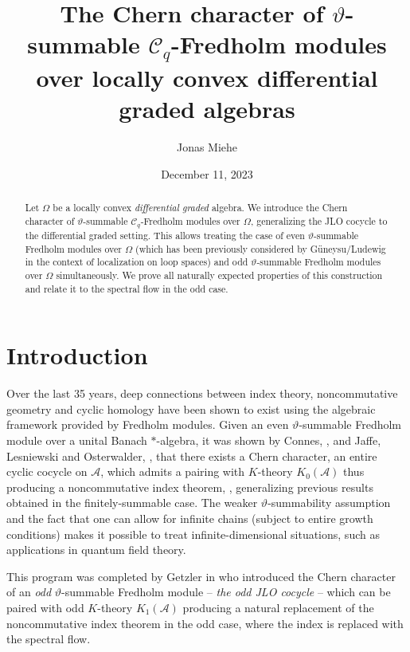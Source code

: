 \documentclass[a4paper, english, 12pt, bibliography=totocnumbered,
index=totoc]{scrartcl}
\title{The Chern character of \texorpdfstring{$\vartheta$}{ϑ}-summable
\texorpdfstring{$\mathcal{C}_q$}{C(q)}-Fredholm modules over locally convex
differential graded algebras}
\author{Jonas Miehe}
\date{December 11, 2023}
\begin{document}
\maketitle

\begin{abstract}
	Let $\Omega$ be a locally convex \emph{differential graded} algebra.
	We introduce the Chern character of $\vartheta$-summable
	$\mathcal{C}_q$-Fredholm modules over $\Omega$,
	generalizing the JLO cocycle to the differential graded setting.
	This allows treating the case of even $\vartheta$-summable Fredholm modules
	over $\Omega$
	(which has been previously considered by Güneysu/Ludewig in the context of
	localization on loop spaces) and odd
	$\vartheta$-summable Fredholm modules over $\Omega$
	simultaneously.
	We prove all naturally expected properties of this construction and
	relate it to the spectral flow in the odd case.
\end{abstract}

\section{Introduction}
Over the last 35 years, deep connections between index theory, noncommutative
geometry and cyclic homology have been shown to exist using the
algebraic framework provided by Fredholm modules.
Given an even $\vartheta$-summable Fredholm module over a unital Banach
$*$-algebra, it was shown by Connes, \cite{ConnesCyclicCohomology}, and
Jaffe, Lesniewski and Osterwalder, \cite{JLO}, that there exists a Chern
character, an entire cyclic
cocycle on $\mathcal{A}$, which admits a pairing with $K$-theory
$K_0(\mathcal{A})$ thus producing a noncommutative index theorem,
\cite{GetzlerSzenes}, generalizing previous results obtained in the
finitely-summable case.
The weaker $\vartheta$-summability assumption and the
fact that one can allow for infinite chains (subject to entire growth
conditions) makes it possible to treat infinite-dimensional situations, such as
applications in quantum field theory.

This program was completed by Getzler in \cite{GetzlerOdd} who introduced the
Chern character of an \emph{odd} $\vartheta$-summable Fredholm module --
\textit{the odd JLO cocycle} -- which can be
paired with odd $K$-theory $K_1(\mathcal{A})$ producing a natural replacement
of the noncommutative index theorem in the odd case, where the index is
replaced with the spectral flow.
\end{document}
